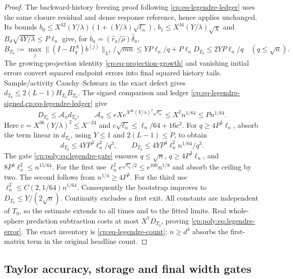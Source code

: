 \begin{proof}
The backward-history freezing proof following
\eqref{cp:eq-legendre-ledger} uses the same closure residual and dense
response reference, hence applies unchanged. Its bounds
$b_0\le X^{42}(Y/\lambda)(1+(Y/\lambda)\sqrt{\ell_n})$,
$b_1\le X^{16}(Y/\lambda)\sqrt\chi$ and
$B_d\sqrt{4Y/\lambda}\le P\ell_n$ give, for
$b_a=(\widehat r_a/\widehat\rho)\widehat\delta_a$,
\[
B_{T_0}:=\max_j\|(I-\Pi_q^A)b^{(j)}\|_{L^2}/\sqrt{mn}
 \le YP\ell_n/q+P\ell_nD_{T_0}\le2YP\ell_n/q
 \quad(q\le\sqrt n).
\]
The growing-projection identity \eqref{cp:eq-projection-growth}
and vanishing initial errors convert squared endpoint errors into final
squared history tails. Sample/activity Cauchy--Schwarz in the exact defect
gives $d_{T_0}\le2(L-1)H_{T_0}B_{T_0}$.
The signed comparison and ledger
\cref{cp:eq-legendre-signed,cp:eq-legendre-ledger} give
\[
D_{T_0}\le\mathcal A_nd_{T_0},\qquad
\mathcal A_n\le eX
 e^{X^{36}(Y/\lambda)^2\sqrt{\ell_n}}
 \le X^2n^{1/64}\le Pn^{1/64}.
\]
Here $c=X^{36}(Y/\lambda)^2\le X^{-24}$ and
$c\sqrt{\ell_n}\le\ell_n/64+16c^2$.
For $q\ge4P^3\ell_n$, absorb the term linear in $d_{T_0}$,
using $Y\le1$ and $2(L-1)\le P$, to obtain
\begin{equation}
d_{T_0}\le4YP^3\ell_n^2/q^3,\qquad
D_{T_0}\le4YP^4\ell_n^2n^{1/64}/q^3.
\label{cp:poly:eq:third-order-defect}
\end{equation}
The gate \eqref{cp:poly:eq:legendre-gate} ensures
$q\le\sqrt n$, $q\ge4P^3\ell_n$, and
$8P^4\ell_n^2\le n^{15/64}$.
For the first use
$\ell_n^2e^{\sqrt{\ell_n}/2}\le e^{100}n^{1/8}$ and absorb the ceiling
by two. The second follows from $n^{1/4}\ge4P^3$.
For the third use $\ell_n^2\le C(2,1/64)n^{1/64}$.
Consequently the bootstrap improves to $D_{T_0}\le Y/(2\sqrt n)$.
Continuity excludes a first exit. All constants are independent of $T_0$,
so the estimate extends to all times and to the fitted limits. Real
whole-sphere prediction subtraction costs at most $X^7D_{T_0}$,
proving \eqref{cp:poly:eq:legendre-error}.
The exact inventory is \eqref{cp:eq-legendre-count}; $n\ge d^4$
absorbs the first-matrix term in the original headline count.

\end{proof}

\subsection{Taylor accuracy, storage and final width gates}
\label{cp:poly:assembly}

